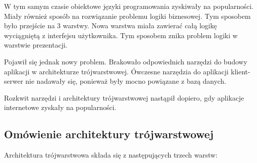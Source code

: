 \documentclass[a4paper,onecolumn,oneside,11pt,wide,floatssmall]{mwrep}
\theoremstyle{definition}
\theoremstyle{plain}%
\theoremstyle{remark}
\begin{document}
W tym samym czasie obiektowe języki programowania zyskiwały na popularności. Miały również sposób na rozwiązanie 
problemu logiki biznesowej. Tym sposobem było przejście na 3 warstwy. Nowa warstwa miała zawierać całą logikę 
wyciągniętą z interfejsu użytkownika. Tym sposobem znika problem logiki w warstwie prezentacji.

Pojawił się jednak nowy problem. Brakowało odpowiednich narzędzi do budowy aplikacji w architekturze trójwarstwowej. 
Ówczesne narzędzia do aplikacji klient-serwer nie nadawały się, ponieważ były mocno powiązane z bazą danych. 

Rozkwit narzędzi i architektury trójwarstwowej nastąpił dopiero, gdy aplikacje internetowe zyskały na popularności.

\subsection{Omówienie architektury trójwarstwowej}

Architektura trójwarstwowa składa się z następujących trzech warstw:
\end{document}

